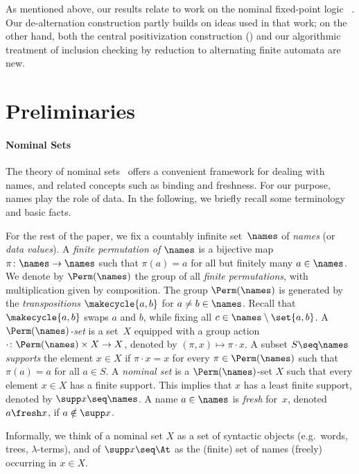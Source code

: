 \documentclass[10pt, final, conference, a4paper, twocolumn]{IEEEtran}
\begin{document}
As mentioned above, our results relate to work on the
nominal fixed-point logic \muBar~\cite{hms21}. Our de-alternation
construction partly builds on ideas used in that work; on the other
hand, both the central positivization construction
() and our algorithmic treatment of inclusion
checking by reduction to alternating finite automata are new. %

\section{Preliminaries}\label{sec:prelims}

\paragraph*{Nominal Sets}
The theory of nominal sets~\cite{Pitts2013} offers a convenient framework for dealing with names, and related concepts such as binding and freshness. For our purpose, names play the role of data.
In the following, we briefly recall some terminology and basic facts.

For the rest of the paper, we fix a countably infinite set~$\names$ of \emph{names} (or \emph{data values}). A \emph{finite permutation of $\names$} is a bijective map $\pi\colon \names\to\names$ such that $\pi(a) = a$ for all but finitely many $a\in \names$.
We denote by $\Perm(\names)$ the group of all \emph{finite permutations}, with multiplication given by composition.
The group $\Perm(\names)$ is generated by the \emph{transpositions} $\makecycle{a, b}$ for $a \neq b \in \names$.
Recall that $\makecycle{a, b}$ swaps $a$ and $b$, while fixing all $c\in \names\setminus \set{a, b}$.
A \emph{$\Perm(\names)$-set} is a set~$X$ equipped with a group action $\cdot\colon \Perm(\names) \times X \to X$,
denoted by $(\pi,x)\mapsto \pi\cdot x$. A subset $S\seq \names$ \emph{supports} the element $x\in X$ if $\pi \cdot x = x$ for every
$\pi\in\Perm(\names)$ such that $\pi(a) = a$ for all $a \in S$. A \emph{nominal set} is a $\Perm(\names)$-set $X$ such that every element $x\in X$ has a finite support.
This implies that $x$ has a least finite support, denoted by $\supp x \seq \names$. A name $a \in \names$ is \emph{fresh} for~$x$, denoted $a \fresh x$, if $a \notin \supp x$. 

Informally, we think of a nominal set $X$ as a set of syntactic objects (e.g.~words, trees,
$\lambda$-terms), and of $\supp x\seq \At$ as the (finite) set of names (freely) occurring in $x\in X$.
\end{document}
